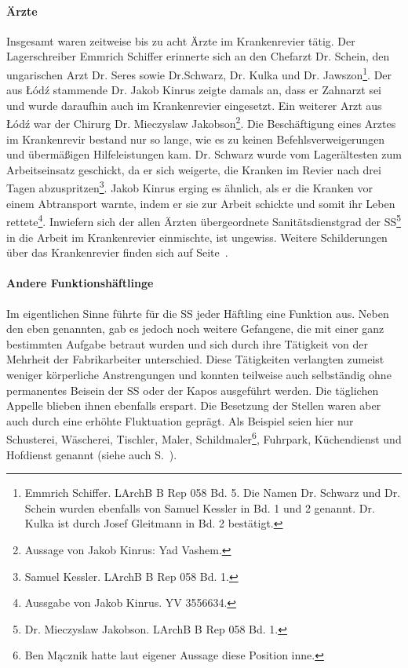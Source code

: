 \documentclass[a4paper,12pt,ngerman,
]{nisebook}
\begin{document}
\paragraph{Ärzte}
\label{arzt}
Insgesamt waren zeitweise bis zu acht Ärzte im Krankenrevier tätig. Der Lagerschreiber Emmrich Schiffer erinnerte sich an den Chefarzt Dr. Schein, den ungarischen Arzt Dr. Seres sowie Dr.Schwarz, Dr. Kulka und Dr. Jawszon\footnote{Emmrich Schiffer. LArchB B Rep 058 Bd. 5. Die Namen Dr. Schwarz und Dr. Schein wurden ebenfalls von Samuel Kessler in Bd. 1 und 2 genannt. Dr. Kulka ist durch Josef Gleitmann in Bd. 2 bestätigt.}.
Der aus \L \'od\'z stammende Dr. Jakob Kinrus zeigte damals an, dass er Zahnarzt sei und wurde daraufhin auch im Krankenrevier eingesetzt. Ein weiterer Arzt aus \L \'od\'z war der Chirurg Dr. Mieczyslaw Jakobson\footnote{Aussage von Jakob Kinrus: Yad Vashem.}.
Die Beschäftigung eines Arztes im Krankenrevir bestand nur so lange, wie es zu keinen Befehlsverweigerungen und übermäßigen Hilfeleistungen kam.
Dr. Schwarz wurde vom Lagerältesten zum Arbeitseinsatz geschickt, da er sich weigerte, die Kranken im Revier nach drei Tagen \glqq abzuspritzen\grqq\footnote{Samuel Kessler. LArchB B Rep 058 Bd. 1.}.
Jakob Kinrus erging es ähnlich, als er die Kranken vor einem Abtransport warnte, indem er sie zur Arbeit schickte und somit ihr Leben rettete\footnote{Aussgabe von Jakob Kinrus. YV 3556634.}.
\newline
Inwiefern sich der allen Ärzten übergeordnete Sanitätsdienstgrad der SS\footnote{Dr. Mieczyslaw Jakobson. LArchB B Rep 058 Bd. 1.} in die Arbeit im Krankenrevier einmischte, ist ungewiss. Weitere Schilderungen über das Krankenrevier finden sich auf Seite~\pageref{krank}.

\paragraph{Andere Funktionshäftlinge}
Im eigentlichen Sinne führte für die SS jeder Häftling eine Funktion aus. Neben den eben genannten, gab es jedoch noch weitere Gefangene, die mit einer ganz bestimmten Aufgabe betraut wurden und sich durch ihre Tätigkeit von der Mehrheit der Fabrikarbeiter unterschied. Diese Tätigkeiten verlangten zumeist weniger körperliche Anstrengungen und konnten teilweise auch selbständig ohne permanentes Beisein der SS oder der Kapos ausgeführt werden. Die täglichen Appelle blieben ihnen ebenfalls erspart. Die Besetzung der Stellen waren aber auch durch eine erhöhte Fluktuation geprägt.\newline
Als Beispiel seien hier nur Schusterei, Wäscherei, Tischler, Maler, Schildmaler\footnote{Ben Mącznik hatte laut eigener Aussage diese Position inne.}, Fuhrpark, Küchendienst und Hofdienst genannt (siehe auch S.~\pageref{lagerarbeit}).
\end{document}
